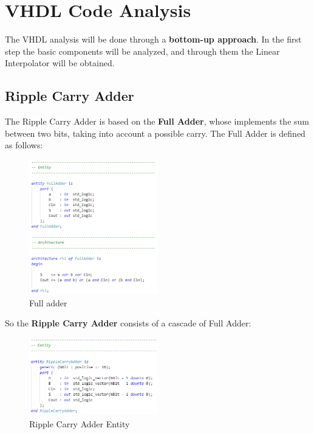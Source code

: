 \section{VHDL Code Analysis}

The VHDL analysis will be done through a \textbf{bottom-up approach}. In the first step the basic components will be analyzed, and through them the Linear Interpolator will be obtained.

\subsection{Ripple Carry Adder}

The Ripple Carry Adder is based on the \textbf{Full Adder}, whose implements the sum between two bits, taking into account a possible carry. The Full Adder is defined as follows:

\begin{figure}[H]
    \centering
    \includegraphics[width=0.5\textwidth]{img/Chapter3/FA.png}
    \caption{Full adder}
    \label{fig:FA}
\end{figure}

So the \textbf{Ripple Carry Adder} consists of a cascade of Full Adder:

\begin{figure}[H]
    \centering
    \includegraphics[width=0.5\textwidth]{img/Chapter3/RCA-entity.png}
    \caption{Ripple Carry Adder Entity}
    \label{fig:RCAE}
\end{figure}

